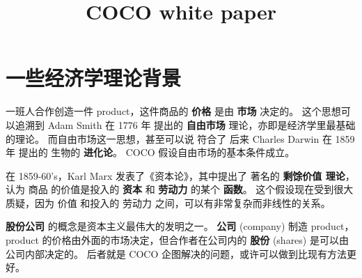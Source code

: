 \documentclass[12pt, orivec]{article}
\title{\color{blue} COCO white paper}
\author{\cc{甄景贤}{YKY}}
\newcommand{\cc}[2]{#1}
\newcommand{\cc}[2]{#2}
\begin{document}
\setlength{\parindent}{0pt}
\setlength{\parskip}{2.8ex plus0.8ex minus0.8ex}

\maketitle

\begin{abstract}
\end{abstract}

\cc{\section{一些经济学理论背景}} %

\cc{
一班人合作创造一件 product，这件商品的 \textbf{价格} 是由 \textbf{市场} 决定的。  这个思想可以追溯到 Adam Smith 在 1776 年 提出的 \textbf{自由市场} 理论，亦即是经济学里最基础的理论。 而自由市场这一思想，甚至可以说 符合了 后来 Charles Darwin 在 1859 年 提出的 生物的 \textbf{进化论}。  COCO 假设自由市场的基本条件成立。
}{
}

\cc{
在 1859-60's，Karl Marx 发表了《资本论》，其中提出了 著名的 \textbf{剩馀价值 理论}，认为 商品 的价值是投入的 \textbf{资本} 和 \textbf{劳动力} 的某个 \textbf{函数}。  这个假设现在受到很大质疑，因为 价值 和投入的 劳动力 之间，可以有非常复杂而非线性的关系。 
}{
}

\cc{
\textbf{股份公司} 的概念是资本主义最伟大的发明之一。  \textbf{公司} (company) 制造 product，product 的价格由外面的市场决定，但合作者在公司内的 \textbf{股份} (shares) 是可以由公司内部决定的。  后者就是 COCO 企图解决的问题，或许可以做到比现有方法更好。
}{
}
\end{document}
